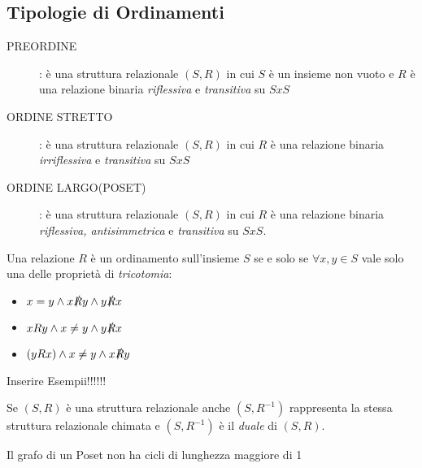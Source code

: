 \subsection{Tipologie di Ordinamenti}
\begin{description}
    \item[PREORDINE]: è una struttura relazionale $(S,R)$ in cui $S$ è un insieme non vuoto
          e $R$ è una relazione binaria \emph{riflessiva} e \emph{transitiva} su $S x S$
    \item[ORDINE STRETTO]: è una struttura relazionale $(S,R)$ in cui $R$ è una
          relazione binaria \emph{irriflessiva} e \emph{transitiva} su $S x S$
    \item[ORDINE LARGO(POSET)]: è una struttura relazionale $(S,R)$ in cui $R$ è una
          relazione binaria \emph{riflessiva, antisimmetrica} e \emph{transitiva} su $S x S$.
\end{description}

Una relazione $R$ è un ordinamento sull'insieme $S$ se e solo se $\forall x,y \in S$
vale solo una delle proprietà di \emph{tricotomia}:
\begin{itemize}
    \item $x = y \land x \slashed{R} y \land y \slashed{R} x$
    \item $xRy \land x \neq y \land y \slashed{R} x$
    \item $(yRx) \land x \neq y \land x \slashed{R} y$
\end{itemize}

Inserire Esempii!!!!!!

\begin{prop}
Se $(S,R)$ è una struttura relazionale anche $(S,R^{-1})$ rappresenta la stessa
struttura relazionale chimata e $(S,R^{-1})$ è il \emph{duale} di $(S,R)$.
\end{prop}


\begin{prop}
Il grafo di un Poset non ha cicli di lunghezza maggiore di 1
\end{prop}

